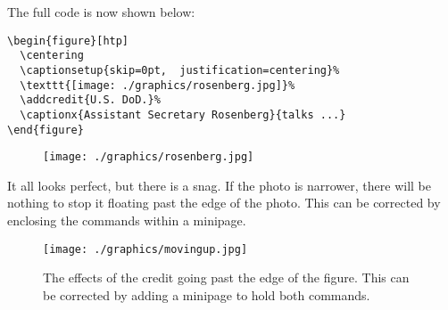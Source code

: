 The full code is now shown below:

\begin{verbatim}
\begin{figure}[htp]
  \centering
  \captionsetup{skip=0pt,  justification=centering}%
  \texttt{[image: ./graphics/rosenberg.jpg]}%
  \addcredit{U.S. DoD.}%
  \captionx{Assistant Secretary Rosenberg}{talks ...}
\end{figure}
\end{verbatim}

\begin{figure}[htp]
  \centering
  \captionsetup{name=Photo, labelsep=period, skip=0pt, position=top, textfont=scriptsize,    justification=centering}%
\texttt{[image: ./graphics/rosenberg.jpg]}%
%
\vspace{10pt}
\end{figure}

It all looks perfect, but there is a snag. If the photo is narrower, there will be nothing to stop it floating past the edge of the photo. This can be corrected by enclosing the commands within a minipage.


\begin{figure}[htp]
\captionsetup{name=Fig., labelsep=period}%
\texttt{[image: ./graphics/movingup.jpg]}%
%
\caption{The effects of the credit going past the edge of the figure. This can be corrected by adding a minipage to hold both commands. }
\end{figure}



